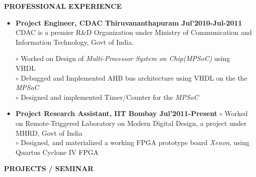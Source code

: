 \documentclass[a4paper,10pt]{article}
\begin{document}
 
  \colorbox{titleColor}{\parbox{6.5in}{\textbf{PROFESSIONAL EXPERIENCE}}}
   \begin{itemize}
    \item \textbf{Project Engineer, CDAC Thiruvananthapuram \qquad\qquad\qquad\quad\qquad\qquad Jul'2010-Jul-2011\\}
    CDAC is a premier R\&D Organization under Ministry of Communication and Information Technology, Govt of India.

    $\circ$  Worked on  Design of \textit{Multi-Processor System on Chip(MPSoC)} using VHDL \\
    $\circ$  Debugged and Implemented AHB bus architecture using VHDL on the the \textit{MPSoC}\\
    $\circ$  Designed and implemented Timer/Counter for the \textit{MPSoC}
    \item \textbf{Project Research Assistant, IIT Bombay 	\qquad\qquad\qquad\qquad\quad\qquad\qquad\qquad Jul'2011-Present}
     $\circ$ Worked on Remote-Triggered Laboratory on Modern Digital Design, a project under MHRD, Govt of India\\
    $\circ$ Designed, and materialized a working FPGA prototype board \textit{Xenon}, using Quartus Cyclone IV FPGA  
    
 \end{itemize}
 


 \colorbox{titleColor}{\parbox{6.5in}{\textbf{PROJECTS / SEMINAR}}}
\end{document}
